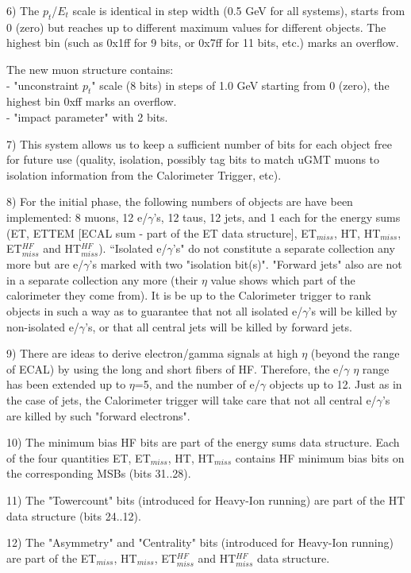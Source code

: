 \documentclass{cmspaper}
\begin{document}
6) The $p_t$/$E_t$ scale is identical in step width (0.5 GeV for all systems), starts from 0 (zero) but reaches up to different maximum values for different objects. The highest bin (such as 0x1ff for 9 bits, or 0x7ff for 11 bits, etc.) marks an overflow.

The new muon structure contains:\\
- "unconstraint $p_t$" scale (8 bits) in steps of 1.0 GeV starting from 0 (zero), the highest bin 0xff marks an overflow.\\ 
- "impact parameter" with 2 bits.

7) This system allows us to keep a sufficient number of bits for each object free for future use (quality, isolation, possibly tag bits to match uGMT muons to isolation information from the Calorimeter Trigger, etc).

8) For the initial phase, the following numbers of objects are have been implemented: 8 muons, 12 e/$\gamma$'s, 12 taus, 12 jets, and 1 each for the energy sums (ET, ETTEM [ECAL sum - part of the ET data structure], ET$_{miss}$, HT, HT$_{miss}$, ET$_{miss}^{HF}$ and HT$_{miss}^{HF}$).
``Isolated e/$\gamma$'s" do not constitute a separate collection any more but are e/$\gamma$'s marked with two "isolation bit(s)". "Forward jets" also are not in a separate collection any more (their $\eta$ value shows which part of the calorimeter they come from). It is be up to the Calorimeter trigger to rank objects in such a way as to guarantee that not all isolated e/$\gamma$'s will be killed by non-isolated e/$\gamma$'s, or that all central jets will be killed by forward jets. 

9) There are ideas to derive electron/gamma signals at high $\eta$ (beyond the range of ECAL) by using the long and short fibers of HF. Therefore, the e/$\gamma$ $\eta$ range has been extended up to $\eta$=5, and the number of e/$\gamma$ objects up to 12. Just as in the case of jets, the Calorimeter trigger will take care that not all central e/$\gamma$'s are killed by such "forward electrons". 

10) The minimum bias HF bits are part of the energy sums data structure. Each of the four quantities ET, ET$_{miss}$, HT, HT$_{miss}$ contains HF minimum bias bits on the corresponding MSBs (bits 31..28).
 
11) The "Towercount" bits (introduced for Heavy-Ion running) are part of the HT data structure (bits 24..12).

12) The "Asymmetry" and "Centrality" bits (introduced for Heavy-Ion running) are part of the ET$_{miss}$, HT$_{miss}$, ET$_{miss}^{HF}$ and HT$_{miss}^{HF}$ data structure.
 
\end{document}
